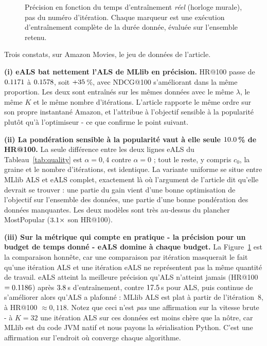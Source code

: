 \begin{figure}[htbp]\centering
{}
\caption{Précision en fonction du temps d'entraînement \emph{réel} (horloge murale),
pas du numéro d'itération. Chaque marqueur est une exécution d'entraînement complète
de la durée donnée, évaluée sur l'ensemble retenu.}\label{fig:qualtime}
\end{figure}

Trois constats, sur Amazon Movies, le jeu de données de l'article.

\textbf{(i) eALS bat nettement l'ALS de MLlib en précision.} HR@100 passe de $0.1171$ à
$0.1578$, soit $+35$\,\%, avec NDCG@100 s'améliorant dans la même proportion.
Les deux sont entraînés sur les mêmes données avec le même $\lambda$, le même $K$ et
le même nombre d'itérations. L'article rapporte le même ordre sur son propre
instantané Amazon, et l'attribue à l'objectif sensible à la popularité plutôt qu'à
l'optimiseur - ce que confirme le point suivant.

\textbf{(ii) La pondération sensible à la popularité vaut à elle seule
$10.0$\,\% de HR@100.} La seule différence entre les deux lignes eALS du
Tableau~\ref{tab:quality} est $\alpha=0,4$ contre $\alpha=0$ ; tout le reste, y
compris $c_0$, la graine et le nombre d'itérations, est identique. La variante
uniforme se situe entre MLlib ALS et eALS complet, exactement là où l'argument de
l'article dit qu'elle devrait se trouver : une partie du gain vient d'une bonne
optimisation de l'objectif sur l'ensemble des données, une partie d'une bonne
pondération des données manquantes. Les deux modèles sont très au-dessus du plancher
MostPopular ($3.1\times$ son HR@100).

\textbf{(iii) Sur la métrique qui compte en pratique - la précision pour un budget
de temps donné - eALS domine à chaque budget.} La Figure~\ref{fig:qualtime} est la
comparaison honnête, car une comparaison par itération masquerait le fait qu'une
itération ALS et une itération eALS ne représentent pas la même quantité de travail.
eALS atteint la meilleure précision qu'ALS n'atteint jamais (HR@100 $=0.1186$)
après $3.8$\,s d'entraînement, contre $17.5$\,s pour ALS, puis
continue de s'améliorer alors qu'ALS a plafonné : MLlib ALS est plat à partir de
l'itération~8, à HR@100 $\approx 0,118$. Notez que ceci n'est \emph{pas} une
affirmation sur la vitesse brute - à $K=32$ une itération ALS sur ces données est
moins chère que la nôtre, car MLlib est du code JVM natif et nous payons la
sérialisation Python. C'est une affirmation sur l'endroit où converge chaque
algorithme.
